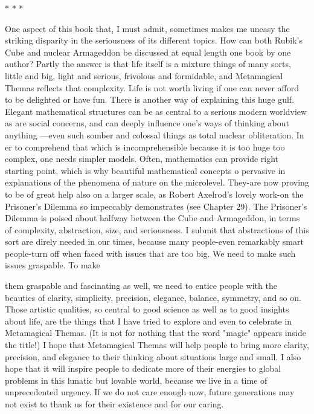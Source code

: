                                        *   *   *

        One aspect of this book that, I must admit, sometimes makes me uneasy the
striking disparity in the seriousness of its different topics. How can both Rubik's Cube
and nuclear Armageddon be discussed at equal length one book by one author? Partly
the answer is that life itself is a mixture things of many sorts, little and big, light and
serious, frivolous and formidable, and Metamagical Themas reflects that complexity.
Life is not worth living if one can never afford to be delighted or have fun. There is
another way of explaining this huge gulf. Elegant mathematical structures can be as
central to a serious modern worldview as are social concerns, and can deeply
influence one's ways of thinking about anything ---even such somber and colossal
things as total nuclear obliteration. In er to comprehend that which is
incomprehensible because it is too huge too complex, one needs simpler models.
Often, mathematics can provide right starting point, which is why beautiful
mathematical concepts o pervasive in explanations of the phenomena of nature on the
microlevel. They-are now proving to be of great help also on a larger scale, as Robert
Axelrod's lovely work-on the Prisoner's Dilemma so impeccably demonstrates (see
Chapter 29).
        The Prisoner's Dilemma is poised about halfway between the Cube and
Armageddon, in terms of complexity, abstraction, size, and seriousness. I submit that
abstractions of this sort are direly needed in our times, because many people-even
remarkably smart people-turn off when faced with issues that are too big. We need to
make such issues graspable. To make





them graspable and fascinating as well, we need to entice people with the beauties of
clarity, simplicity, precision, elegance, balance, symmetry, and so on.
         Those artistic qualities, so central to good science as well as to good insights
about life, are the things that I have tried to explore and even to celebrate in
Metamagical Themas. (It is not for nothing that the word "magic" appears inside the
title!) I hope that Metamagical Themas will help people to bring more clarity,
precision, and elegance to their thinking about situations large and small. I also hope
that it will inspire people to dedicate more of their energies to global problems in this
lunatic but lovable world, because we live in a time of unprecedented urgency. If we
do not care enough now, future generations may not exist to thank us for their
existence and for our caring.





